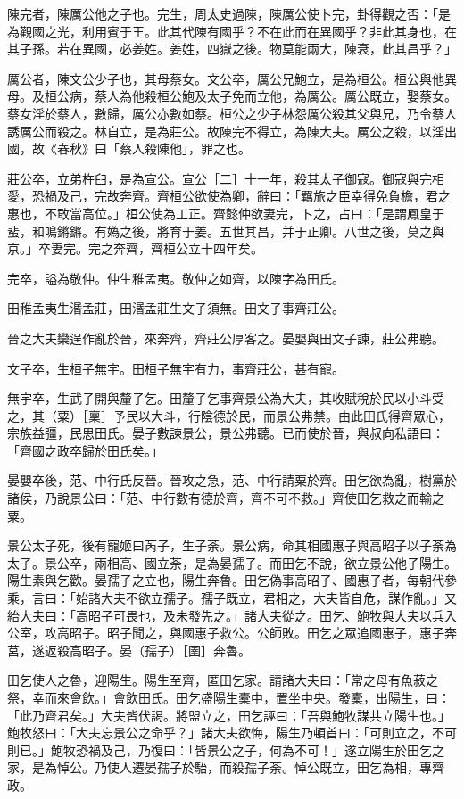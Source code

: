 
\begin{pinyinscope}
陳完者，陳厲公他之子也。完生，周太史過陳，陳厲公使卜完，卦得觀之否：「是為觀國之光，利用賓于王。此其代陳有國乎？不在此而在異國乎？非此其身也，在其子孫。若在異國，必姜姓。姜姓，四嶽之後。物莫能兩大，陳衰，此其昌乎？」

厲公者，陳文公少子也，其母蔡女。文公卒，厲公兄鮑立，是為桓公。桓公與他異母。及桓公病，蔡人為他殺桓公鮑及太子免而立他，為厲公。厲公既立，娶蔡女。蔡女淫於蔡人，數歸，厲公亦數如蔡。桓公之少子林怨厲公殺其父與兄，乃令蔡人誘厲公而殺之。林自立，是為莊公。故陳完不得立，為陳大夫。厲公之殺，以淫出國，故《春秋》曰「蔡人殺陳他」，罪之也。

莊公卒，立弟杵臼，是為宣公。宣公［二］十一年，殺其太子御寇。御寇與完相愛，恐禍及己，完故奔齊。齊桓公欲使為卿，辭曰：「羈旅之臣幸得免負檐，君之惠也，不敢當高位。」桓公使為工正。齊懿仲欲妻完，卜之，占曰：「是謂鳳皇于蜚，和鳴鏘鏘。有媯之後，將育于姜。五世其昌，并于正卿。八世之後，莫之與京。」卒妻完。完之奔齊，齊桓公立十四年矣。

完卒，謚為敬仲。仲生稚孟夷。敬仲之如齊，以陳字為田氏。

田稚孟夷生湣孟莊，田湣孟莊生文子須無。田文子事齊莊公。

晉之大夫欒逞作亂於晉，來奔齊，齊莊公厚客之。晏嬰與田文子諫，莊公弗聽。

文子卒，生桓子無宇。田桓子無宇有力，事齊莊公，甚有寵。

無宇卒，生武子開與釐子乞。田釐子乞事齊景公為大夫，其收賦稅於民以小斗受之，其（粟）［稟］予民以大斗，行陰德於民，而景公弗禁。由此田氏得齊眾心，宗族益彊，民思田氏。晏子數諫景公，景公弗聽。已而使於晉，與叔向私語曰：「齊國之政卒歸於田氏矣。」

晏嬰卒後，范、中行氏反晉。晉攻之急，范、中行請粟於齊。田乞欲為亂，樹黨於諸侯，乃說景公曰：「范、中行數有德於齊，齊不可不救。」齊使田乞救之而輸之粟。

景公太子死，後有寵姬曰芮子，生子荼。景公病，命其相國惠子與高昭子以子荼為太子。景公卒，兩相高、國立荼，是為晏孺子。而田乞不說，欲立景公他子陽生。陽生素與乞歡。晏孺子之立也，陽生奔魯。田乞偽事高昭子、國惠子者，每朝代參乘，言曰：「始諸大夫不欲立孺子。孺子既立，君相之，大夫皆自危，謀作亂。」又紿大夫曰：「高昭子可畏也，及未發先之。」諸大夫從之。田乞、鮑牧與大夫以兵入公室，攻高昭子。昭子聞之，與國惠子救公。公師敗。田乞之眾追國惠子，惠子奔莒，遂返殺高昭子。晏（孺子）［圉］奔魯。

田乞使人之魯，迎陽生。陽生至齊，匿田乞家。請諸大夫曰：「常之母有魚菽之祭，幸而來會飲。」會飲田氏。田乞盛陽生橐中，置坐中央。發橐，出陽生，曰：「此乃齊君矣。」大夫皆伏謁。將盟立之，田乞誣曰：「吾與鮑牧謀共立陽生也。」鮑牧怒曰：「大夫忘景公之命乎？」諸大夫欲悔，陽生乃頓首曰：「可則立之，不可則已。」鮑牧恐禍及己，乃復曰：「皆景公之子，何為不可！」遂立陽生於田乞之家，是為悼公。乃使人遷晏孺子於駘，而殺孺子荼。悼公既立，田乞為相，專齊政。


\end{pinyinscope}
